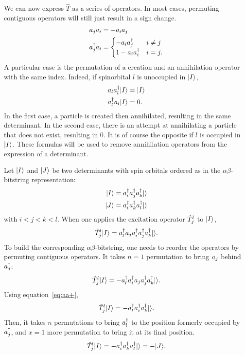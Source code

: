 \documentclass[./thesis.tex]{subfiles}
\begin{document}
We can now express $\hat T$ as a series of operators.
In most cases, permuting contiguous operators will still just result in a sign change.
\begin{align}
a_{j} a_{i} & = -a_{i} a_{j} \\
a^\dagger_{j} a_{i} & =
  \begin{cases}
  -a_{i} a^\dagger_{j} & i \ne j \\
  1 - a_{i} a^\dagger_{i} & i = j.
  \end{cases}
\end{align}
A particular case is the permutation of a creation and an annihilation operator with the same index.
Indeed, if spinorbital $l$ is unoccupied in ${\ket{I}}$,
\begin{align}
\label{eq:aa+}
a_{l} a^\dagger_{l} {\ket{I}} & = {\ket{I}}  \\
a^\dagger_{l} a_{l} {\ket{I}} & = 0 .
\end{align}
In the first case, a particle is created then annihilated, resulting in the same determinant. In the second case, there is an attempt at annihilating a particle that does not exist, resulting in $0$. It is of course the opposite if $l$ is occupied in ${\ket{I}}$.
These formulas will be used to remove annihilation operators from the expression of a determinant.



Let ${\ket{I}}$ and ${\ket{J}}$ be two determinants with spin orbitals ordered as in the $\alpha \beta$-bitstring  representation:
\begin{align}
{\ket{I}} & = a^\dagger_{i}a^\dagger_{j}a^\dagger_{k} {\ket{}} \\
{\ket{J}} & = a^\dagger_{i}a^\dagger_{k}a^\dagger_{l} {\ket{}}
\end{align}
with $i<j<k<l$.
When one applies the excitation operator ${\hat{T}_{j}^{l}}$ to ${\ket{I}}$,
\begin{equation}
{\hat{T}_{j}^{l}} {\ket{I}} = a^\dagger_{l} a_{j} a^\dagger_{i} a^\dagger_{j} a^\dagger_{k} {\ket{}}.
\end{equation}
To build the corresponding $\alpha \beta$-bitstring, one needs to
reorder the operators by permuting contiguous operators.
It takes $n=1$ permutation to bring $a_{j}$ behind $a^\dagger_{j}$:
\begin{equation}
{\hat{T}_{j}^{l}} {\ket{I}} = -a^\dagger_{l} a^\dagger_{i} a_{j} a^\dagger_{j} a^\dagger_{k} {\ket{}}.
\end{equation}
Using equation~\ref{eq:aa+},
\begin{equation}
{\hat{T}_{j}^{l}} {\ket{I}} = -a^\dagger_{l} a^\dagger_{i} a^\dagger_{k} {\ket{}}.
\end{equation}
Then, it takes $n$ permutations to bring $a^\dagger_{l}$ to the position formerly occupied by $a^\dagger_{j}$, and $x=1$ more permutation to bring it at its final position.
\begin{equation}
{\hat{T}_{j}^{l}} {\ket{I}} = -a^\dagger_{i} a^\dagger_{k} a^\dagger_{l} {\ket{}} = -{\ket{J}}.
\end{equation}
\end{document}
